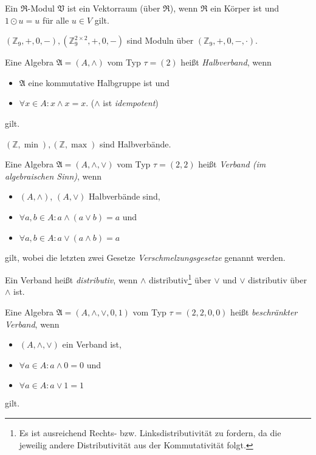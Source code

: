 \begin{remark}
    Ein $\mathfrak{R}$-Modul $\mathfrak{V}$ ist ein Vektorraum (über $\mathfrak{R}$), wenn $\mathfrak{R}$ ein Körper ist und $1\odot u=u$ für alle $u\in V$ gilt.
\end{remark}

\begin{example}
    $(\mathbb{Z}_9, +, 0, -), (\mathbb{Z}_9^{2 \times 2}, +, 0, -)$ sind Moduln über $(\mathbb{Z}_9, +, 0, -, \cdot)$.
\end{example}

\begin{definition}
    Eine Algebra $\mathfrak{A} = (A, \wedge)$ vom Typ $\tau = (2)$ heißt \emph{Halbverband}, wenn
    \begin{itemize}
        \item $\mathfrak{A}$ eine kommutative Halbgruppe ist und
        \item $\forall x \in A: x \wedge x = x$. \tab ($\wedge$ ist \emph{idempotent})
    \end{itemize}
    gilt.
\end{definition}

\begin{remark}
    $(\mathbb{Z}, \min), (\mathbb{Z}, \max)$ sind Halbverbände.
\end{remark}

\begin{definition}
    Eine Algebra $\mathfrak{A} = (A, \wedge, \vee)$ vom Typ $\tau = (2, 2)$ heißt \emph{Verband (im algebraischen Sinn)}, wenn
    \begin{itemize}
        \item $(A, \wedge)$, $(A, \vee)$ Halbverbände sind, 
        \item $\forall a,b \in A: a \wedge (a \vee b) = a$ und
        \item $\forall a,b \in A: a \vee (a \wedge b) = a$
    \end{itemize}
    gilt, wobei die letzten zwei Gesetze \emph{Verschmelzungsgesetze} genannt werden.

    Ein Verband heißt \emph{distributiv}, wenn $\wedge$ distributiv\footnote{Es ist ausreichend Rechts- bzw. Linksdistributivität zu fordern, da die jeweilig andere Distributivität aus der Kommutativität folgt.} über $\vee$ und $\vee$ distributiv über $\wedge$ ist.

    Eine Algebra $\mathfrak{A} = (A, \wedge, \vee, 0, 1)$ vom Typ $\tau = (2,2,0,0)$ heißt \emph{beschränkter Verband}, wenn
    \begin{itemize}
        \item $(A, \wedge, \vee)$ ein Verband ist,
        \item $\forall a \in A: a \wedge 0 = 0$ und
        \item $\forall a \in A: a \vee 1 = 1$
    \end{itemize}
    gilt.
\end{definition}

